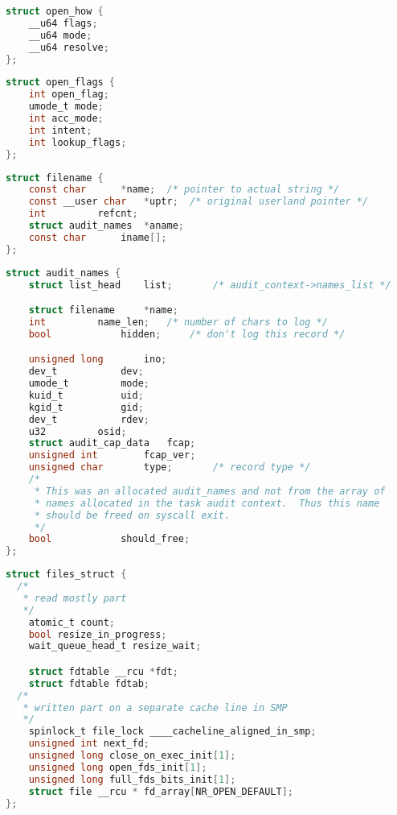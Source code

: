 
\begin{lstlisting}[language=c, caption={struct open\_how}]
struct open_how {
	__u64 flags;
	__u64 mode;
	__u64 resolve;
};
\end{lstlisting}

\begin{lstlisting}[language=c, caption={struct open\_flags}]
struct open_flags {
	int open_flag;
	umode_t mode;
	int acc_mode;
	int intent;
	int lookup_flags;
};
\end{lstlisting}

\begin{lstlisting}[language=c, caption={struct filename}]
struct filename {
	const char		*name;	/* pointer to actual string */
	const __user char	*uptr;	/* original userland pointer */
	int			refcnt;
	struct audit_names	*aname;
	const char		iname[];
};
\end{lstlisting}

\begin{lstlisting}[language=c, caption={struct audit\_names}]
struct audit_names {
	struct list_head	list;		/* audit_context->names_list */

	struct filename		*name;
	int			name_len;	/* number of chars to log */
	bool			hidden;		/* don't log this record */

	unsigned long		ino;
	dev_t			dev;
	umode_t			mode;
	kuid_t			uid;
	kgid_t			gid;
	dev_t			rdev;
	u32			osid;
	struct audit_cap_data	fcap;
	unsigned int		fcap_ver;
	unsigned char		type;		/* record type */
	/*
	 * This was an allocated audit_names and not from the array of
	 * names allocated in the task audit context.  Thus this name
	 * should be freed on syscall exit.
	 */
	bool			should_free;
};
\end{lstlisting}

\begin{lstlisting}[language=c, caption={struct files\_struct}]
struct files_struct {
  /*
   * read mostly part
   */
	atomic_t count;
	bool resize_in_progress;
	wait_queue_head_t resize_wait;

	struct fdtable __rcu *fdt;
	struct fdtable fdtab;
  /*
   * written part on a separate cache line in SMP
   */
	spinlock_t file_lock ____cacheline_aligned_in_smp;
	unsigned int next_fd;
	unsigned long close_on_exec_init[1];
	unsigned long open_fds_init[1];
	unsigned long full_fds_bits_init[1];
	struct file __rcu * fd_array[NR_OPEN_DEFAULT];
};
\end{lstlisting}

